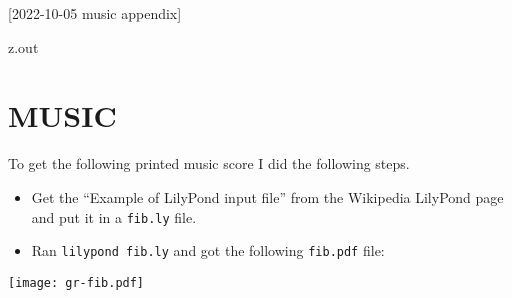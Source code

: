 [2022-10-05 music appendix]

\begin{VerbatimOut}{z.out}
\chapter{MUSIC}

To get the following printed music score I did the following steps.
\begin{itemize}
  \item
    Get the ``Example of LilyPond input file''
    from the Wikipedia LilyPond page
    \cite{wikipedia-lilypond}
    and put it in a \verb+fib.ly+ file.
  \item
    Ran \verb+lilypond fib.ly+ and got the following \verb+fib.pdf+ file:
\end{itemize}

\noindent \texttt{[image: gr-fib.pdf]}
\end{VerbatimOut}

\MyIO
